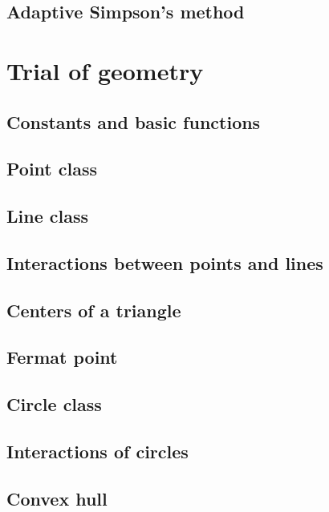 \documentclass[UTF8,a4paper]{report}
\begin{document}
		\section{Adaptive Simpson's method}
			
	\chapter{Trial of geometry}
		\section{Constants and basic functions}
			
		\section{Point class}
			
		\section{Line class}
			
		\section{Interactions between points and lines}
			
		\section{Centers of a triangle}
			
		\section{Fermat point}
			
		\section{Circle class}
			
		\section{Interactions of circles}
			
		\section{Convex hull}
			
\end{document}
